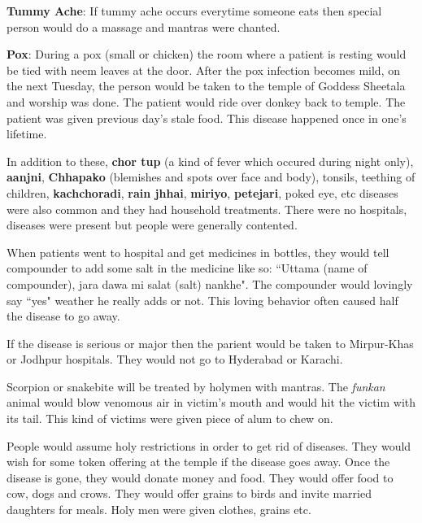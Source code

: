 \textbf{Tummy Ache}: If tummy ache occurs everytime someone eats then special
person would do a massage and mantras were chanted.

\textbf{Pox}: During a pox (small or chicken) the room where a patient is
resting would be tied with neem leaves at the door. After the pox infection
becomes mild, on the next Tuesday, the person would be taken to the temple of
Goddess Sheetala and worship was done. The patient would ride over donkey back
to temple. The patient was given previous day's stale food. This disease
happened once in one's lifetime. 

In addition to these, \textbf{chor tup} (a kind of fever which occured during
night only), \textbf{aanjni}, \textbf{Chhapako} (blemishes and spots over face
and body), tonsils, teething of children, \textbf{kachchoradi}, \textbf{rain
jhhai}, \textbf{miriyo}, \textbf{petejari}, poked eye, etc diseases were also
common and they had household treatments. There were no hospitals, diseases
were present but people were generally contented.

When patients went to hospital and get medicines in bottles, they would tell
compounder to add some salt in the medicine like so: ``Uttama (name of
compounder), jara dawa mi salat (salt) nankhe". The compounder would lovingly
say ``yes" weather he really adds or not. This loving behavior often caused
half the disease to go away.

If the disease is serious or major then the parient would be taken to
Mirpur-Khas or Jodhpur hospitals. They would not go to Hyderabad or Karachi.

Scorpion or snakebite will be treated by holymen with mantras. The
\textit{funkan} animal would blow venomous air in victim's mouth and would hit
the victim with its tail. This kind of victims were given piece of alum to chew
on. 

People would assume holy restrictions in order to get rid of diseases. They
would wish for some token offering at the temple if the disease goes away. Once
the disease is gone, they would donate money and food. They would offer food to
cow, dogs and crows. They would offer grains to birds and invite married
daughters for meals. Holy men were given clothes, grains etc.

